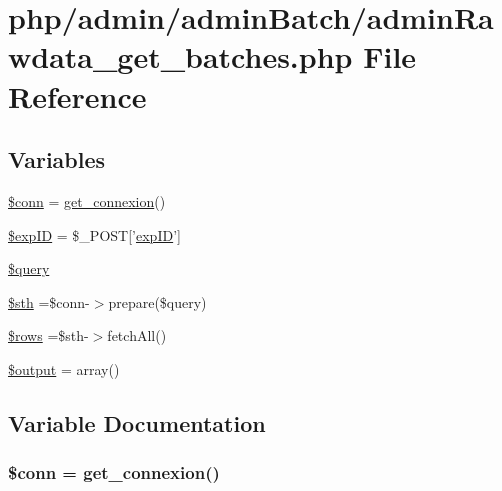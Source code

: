 \hypertarget{admin_batch_2admin_rawdata__get__batches_8php}{\section{php/admin/admin\-Batch/admin\-Rawdata\-\_\-get\-\_\-batches.php File Reference}
\label{admin_batch_2admin_rawdata__get__batches_8php}
}
\subsection*{Variables}
\begin{DoxyCompactItemize}
\item 
\hyperlink{admin_batch_2admin_rawdata__get__batches_8php_aa8a5a87b9c1a6a0819b88447cbe41877}{\$conn} = \hyperlink{php__functions_8php_ace18bc10f3fd08f92688ac743e0d8c2e}{get\-\_\-connexion}()
\item 
\hyperlink{admin_batch_2admin_rawdata__get__batches_8php_ae384d32e62e85e587cd27bf249ed3db3}{\$exp\-I\-D} = \$\-\_\-\-P\-O\-S\-T\mbox{[}'\hyperlink{admin_rawdata_8php_a888d53a6517f4272b5982c3ca9d16e8a}{exp\-I\-D}'\mbox{]}
\item 
\hyperlink{admin_batch_2admin_rawdata__get__batches_8php_af59a5f7cd609e592c41dc3643efd3c98}{\$query}
\item 
\hyperlink{admin_batch_2admin_rawdata__get__batches_8php_afa9126f9664959c02795be300a135f93}{\$sth} =\$conn-\/$>$prepare(\$query)
\item 
\hyperlink{admin_batch_2admin_rawdata__get__batches_8php_ace2ec39e7df3899fa8df9640ec274b03}{\$rows} =\$sth-\/$>$fetch\-All()
\item 
\hyperlink{admin_batch_2admin_rawdata__get__batches_8php_a73004ce9cd673c1bfafd1dc351134797}{\$output} = array()
\end{DoxyCompactItemize}


\subsection{Variable Documentation}
\hypertarget{admin_batch_2admin_rawdata__get__batches_8php_aa8a5a87b9c1a6a0819b88447cbe41877}{
\subsubsection[{\$conn}]{\setlength{\rightskip}{0pt plus 5cm}\$conn = {\bf get\-\_\-connexion}()}}\label{admin_batch_2admin_rawdata__get__batches_8php_aa8a5a87b9c1a6a0819b88447cbe41877}


